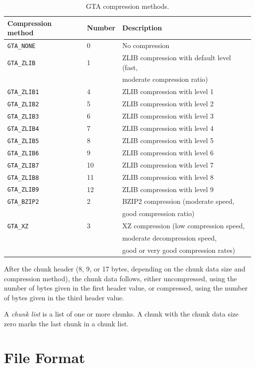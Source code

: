 \documentclass[a4paper,11pt]{article}
\newcommand{\code}[1]{\texttt{#1}}
\begin{document}
\begin{table}
\begin{tabular}{l|l|l}
Compression method & Number & Description\\\hline
\code{GTA\_NONE}  & 0 & No compression \\
\code{GTA\_ZLIB}  & 1 & ZLIB compression with default level (fast,\\
                  &   & moderate compression ratio) \\
\code{GTA\_ZLIB1} & 4 & ZLIB compression with level 1\\
\code{GTA\_ZLIB2} & 5 & ZLIB compression with level 2\\
\code{GTA\_ZLIB3} & 6 & ZLIB compression with level 3\\
\code{GTA\_ZLIB4} & 7 & ZLIB compression with level 4\\
\code{GTA\_ZLIB5} & 8 & ZLIB compression with level 5\\
\code{GTA\_ZLIB6} & 9 & ZLIB compression with level 6\\
\code{GTA\_ZLIB7} & 10& ZLIB compression with level 7\\
\code{GTA\_ZLIB8} & 11& ZLIB compression with level 8\\
\code{GTA\_ZLIB9} & 12& ZLIB compression with level 9\\
\code{GTA\_BZIP2} & 2 & BZIP2 compression (moderate speed,\\
                  &   & good compression ratio) \\
\code{GTA\_XZ}    & 3 & XZ compression (low compression speed,\\
                  &   & moderate decompression speed,\\
		  &   & good or very good compression rates) \\
\end{tabular}
\caption{GTA compression methods.}
\label{tab:compression}
\end{table}

After the chunk header (8, 9, or 17 bytes, depending on the chunk data size
and compression method), the chunk data follows, either uncompressed, using
the number of bytes given in the first header value, or compressed, using
the number of bytes given in the third header value.

A \emph{chunk list} is a list of one or more chunks. A chunk with the chunk
data size zero marks the last chunk in a chunk list.


\section{File Format}
\end{document}
